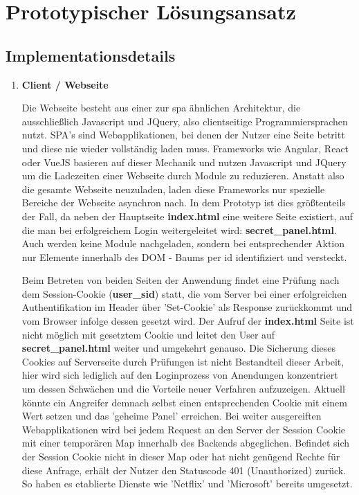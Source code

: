 \chapter{Prototypischer Lösungsansatz}
\section{Implementationsdetails}
\begin{enumerate} 
\item \textbf{Client / Webseite}

Die Webseite besteht aus einer zur \ac{spa} ähnlichen Architektur, die ausschließlich Javascript und JQuery, also clientseitige Programmiersprachen nutzt. SPA's sind Webapplikationen, bei denen der Nutzer eine Seite betritt und diese nie wieder vollständig laden muss. Frameworks wie Angular, React oder VueJS basieren auf dieser Mechanik und nutzen Javascript und JQuery um die Ladezeiten einer Webseite durch Module zu reduzieren. Anstatt also die gesamte Webseite neuzuladen, laden diese Frameworks nur spezielle Bereiche der Webseite asynchron nach. In dem Prototyp ist dies größtenteils der Fall, da neben der Hauptseite \textbf{index.html} eine weitere Seite existiert, auf die man bei erfolgreichem Login weitergeleitet wird: \textbf{secret\_panel.html}. Auch werden keine Module nachgeladen, sondern bei entsprechender Aktion nur Elemente innerhalb des DOM - Baums per id identifiziert und versteckt.

Beim Betreten von beiden Seiten der Anwendung findet eine Prüfung nach dem Session-Cookie (\textbf{user\_sid}) statt, die vom Server bei einer erfolgreichen Authentifikation im Header über 'Set-Cookie' als Response zurückkommt und vom Browser infolge dessen gesetzt wird. Der Aufruf der \textbf{index.html} Seite ist nicht möglich mit gesetztem Cookie und leitet den User auf \textbf{secret\_panel.html} weiter und umgekehrt genauso. Die Sicherung dieses Cookies auf Serverseite durch Prüfungen ist nicht Bestandteil dieser Arbeit, hier wird sich lediglich auf den Loginprozess von Anendungen konzentriert um dessen Schwächen und die Vorteile neuer Verfahren aufzuzeigen. Aktuell könnte ein Angreifer demnach selbst einen entsprechenden Cookie mit einem Wert setzen und das 'geheime Panel' erreichen. Bei weiter ausgereiften Webapplikationen wird bei jedem Request an den Server der Session Cookie mit einer temporären Map innerhalb des Backends abgeglichen. Befindet sich der Session Cookie nicht in dieser Map oder hat nicht genügend Rechte für diese Anfrage, erhält der Nutzer den Statuscode 401 (Unauthorized) zurück. So haben es etablierte Dienste wie 'Netflix' und 'Microsoft' bereits umgesetzt.


\end{enumerate}
